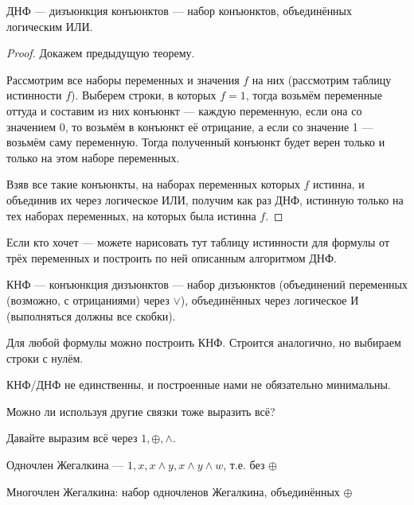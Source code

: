 \begin{definition}
	ДНФ --- дизъюнкция конъюнктов --- набор конъюнктов, объединённых логическим ИЛИ.
\end{definition}

\begin{proof}
	Докажем предыдущую теорему.

	Рассмотрим все наборы переменных и значения $f$ на них (рассмотрим таблицу истинности $f$). Выберем строки, в которых $f = 1$, тогда возьмём переменные оттуда и составим из них конъюнкт --- каждую переменную, если она со значением 0, то возьмём в конъюнкт её отрицание, а если со значение 1 --- возьмём саму переменную. Тогда полученный конъюнкт будет верен только и только на этом наборе переменных.

	Взяв все такие конъюнкты, на наборах переменных которых $f$ истинна, и объединив их через логическое ИЛИ, получим как раз ДНФ, истинную только на тех наборах переменных, на которых была истинна $f$. 
\end{proof}
\begin{example}
	Если кто хочет --- можете нарисовать тут таблицу истинности для формулы от трёх переменных и построить по ней описанным алгоритмом ДНФ. 
\end{example}

\begin{definition}
	КНФ --- конъюнкция дизъюнктов --- набор дизъюнктов (объединений переменных (возможно, с отрицаниями) через $\lor$), объединённых через логическое И (выполняться должны все скобки).
\end{definition}

\begin{theorem}
	Для любой формулы можно построить КНФ. Строится аналогично, но выбираем строки с нулём. 
\end{theorem}

КНФ/ДНФ не единственны, и построенные нами не обязательно минимальны. 

Можно ли используя другие связки тоже выразить всё? 

Давайте выразим всё через $1, \oplus, \land$. 

\begin{definition}
	Одночлен Жегалкина --- $1, x, x \land y, x \land y \land w$, т.е. без $\oplus$
\end{definition}

\begin{definition}
	Многочлен Жегалкина: набор одночленов Жегалкина, объединённых $\oplus$
\end{definition}

